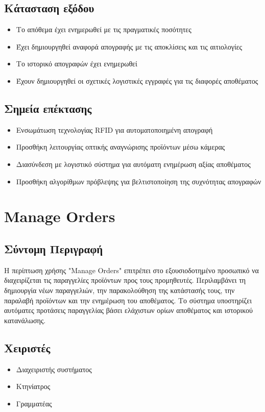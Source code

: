 \documentclass[12pt,a4paper,twoside]{book}
\begin{document}
\subsection{Κάτασταση εξόδου} %
\begin{itemize}
  \item Το απόθεμα έχει ενημερωθεί με τις πραγματικές ποσότητες
  \item Έχει δημιουργηθεί αναφορά απογραφής με τις αποκλίσεις και τις αιτιολογίες %
  \item Το ιστορικό απογραφών έχει ενημερωθεί
  \item Έχουν δημιουργηθεί οι σχετικές λογιστικές εγγραφές για τις διαφορές αποθέματος %
\end{itemize}

\subsection{Σημεία επέκτασης}
\begin{itemize}
  \item Ενσωμάτωση τεχνολογίας RFID για αυτοματοποιημένη απογραφή
  \item Προσθήκη λειτουργίας οπτικής αναγνώρισης προϊόντων μέσω κάμερας
  \item Διασύνδεση με λογιστικό σύστημα για αυτόματη ενημέρωση αξίας αποθέματος %
  \item Προσθήκη αλγορίθμων πρόβλεψης για βελτιστοποίηση της συχνότητας απογραφών
\end{itemize}

\section{Manage Orders}

\subsection{Σύντομη Περιγραφή}
Η περίπτωση χρήσης "Manage Orders" επιτρέπει στο εξουσιοδοτημένο προσωπικό να διαχειρίζεται τις παραγγελίες προϊόντων προς τους προμηθευτές. Περιλαμβάνει τη δημιουργία νέων παραγγελιών, την παρακολούθηση της κατάστασής τους, την παραλαβή προϊόντων και την ενημέρωση του αποθέματος. Το σύστημα υποστηρίζει αυτόματες προτάσεις παραγγελίας βάσει ελάχιστων ορίων αποθέματος και ιστορικού κατανάλωσης. %

\subsection{Χειριστές}
\begin{itemize}
  \item Διαχειριστής συστήματος
  \item Κτηνίατρος
  \item Γραμματέας
\end{itemize}
\end{document}

